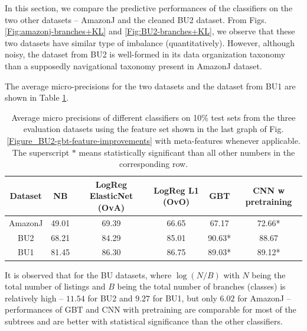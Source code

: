 \vspace{-0.2cm}


In this section, we compare the predictive performances of the classifiers on the two other datasets -- AmazonJ and the cleaned BU2 dataset.
From Figs. \ref{Fig:amazonj-branches+KL} and \ref{Fig:BU2-branches+KL}, we observe that these two datasets have similar type of imbalance (quantitatively).
However, although noisy, the dataset from BU2 is well-formed in its data organization taxonomy than a supposedly navigational taxonomy present in AmazonJ dataset.

The average micro-precisions for the two datasets and the dataset from BU1 are shown in Table \ref*{Table:average-prediction}. 
\begin{table}
	\vspace{-0.7cm}
	\centering
	{\small{
	\begin{tabular}{c c c c c c} \\ \hline 
		Dataset & NB &	LogReg ElasticNet (OvA) &	LogReg L1 (OvO) &	GBT	& CNN w pretraining  \\ \hline
		AmazonJ & 49.01	& 69.39 &	66.65 &	67.17 &	72.66* \\  
		BU2 & 68.21	& 84.29	& 85.01	& 90.63*	& 88.67 \\  
		BU1 & 81.45	& 86.30	& 86.75	& 89.03*	& 89.12* \\  \hline
	\end{tabular}
	}}
	\vspace{-0.4cm}
	\caption{\small{Average micro precisions of different classifiers on 10\% test sets from the three evaluation datasets using the feature set shown in the last graph of Fig. \ref{Figure_BU2-gbt-feature-improvements} with meta-features whenever applicable. The superscript $*$ means statistically significant than all other numbers in the corresponding row.}}
	\label{Table:average-prediction}
	\vspace{-0.3cm}
\end{table}
It is observed that for the BU datasets, where $\log(N/B)$ with $N$ being the total number of listings and $B$ being the total number of branches (classes) is relatively high -- $11.54$ for BU2 and $9.27$ for BU1, but only $6.02$ for AmazonJ -- performances of GBT and CNN with pretraining are comparable for most of the subtrees and are better with statistical significance than the other classifiers.
